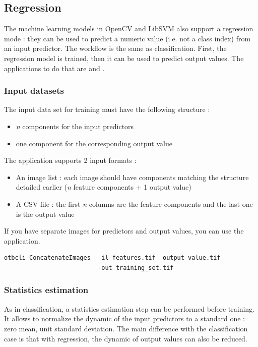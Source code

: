 \subsection{Regression}\label{ssec:regression}

The machine learning models in OpenCV and LibSVM also support a regression mode :
they can be used to predict a numeric value (i.e. not a class index) from an input
predictor. The workflow is the same as classification. First, the regression model
is trained, then it can be used to predict output values. The applications to do
that are  and .

\subsubsection{Input datasets}

The input data set for training must have the following structure :
\begin{itemize}
\item \textit{n} components for the input predictors
\item one component for the corresponding output value
\end{itemize}

The  application supports 2 input formats :
\begin{itemize}
\item An image list : each image should have components matching the structure
detailed earlier (\textit{n} feature components + 1 output value)
\item A CSV file : the first \textit{n} columns are the feature components and
the last one is the output value
\end{itemize}

If you have separate images for predictors and output values, you can use the 
application.

\begin{verbatim}
otbcli_ConcatenateImages  -il features.tif  output_value.tif
                          -out training_set.tif
\end{verbatim}

\subsubsection{Statistics estimation}

As in classification, a statistics estimation step can be performed before
training. It allows to normalize the dynamic of the input predictors to a standard
one : zero mean, unit standard deviation. The main difference with the classification
case is that with regression, the dynamic of output values can also be reduced.

